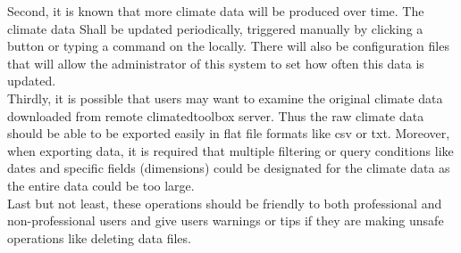 \documentclass[letterpaper,10pt]{article}
\begin{document}
    Second, it is known that more climate data will be produced over time. The climate data Shall be updated periodically, triggered manually by clicking a button or typing a command on the locally. There will also be configuration files that will allow the administrator of this system to set how often this data is updated.\\
    
    Thirdly, it is possible that users may want to examine the original climate data downloaded from remote climatedtoolbox server. Thus the raw climate data should be able to be exported easily in flat file formats like csv or txt. Moreover, when exporting data, it is required that multiple filtering or query conditions like dates and specific fields (dimensions) could be designated for the climate data as the entire data could be too large.\\
    
    Last but not least, these operations should be friendly to both professional and non-professional users and give users warnings or tips if they are making unsafe operations like deleting data files.
\end{document}
